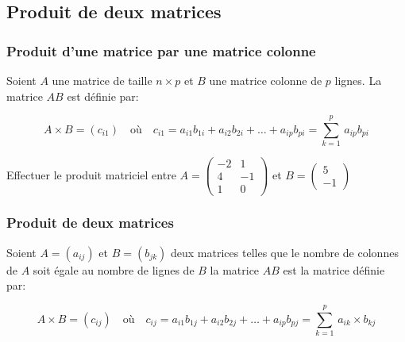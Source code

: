 \documentclass[a4paper]{article}
\begin{document}
\subsection{Produit de deux matrices}

\subsubsection{Produit d'une matrice par une matrice colonne}

\begin{definition}{}{}
	Soient $A$ une matrice de taille $n \times p$ et $B$ une matrice colonne de $p$ lignes. La matrice $AB$ est définie par:

$$A \times B = (c_{i1}) \quad \text{où} \quad  c_{i1}= a_{i1}b_{1i}+a_{i2}b_{2i}+\ldots + a_{ip}b_{pi}= \sum_{k=1}^{p}\,a_{ip}b_{pi}$$
\end{definition}

\begin{example}{}{}
	Effectuer le produit matriciel entre $A=\begin{pmatrix}
-2 & 1 \\
4 & -1 \\
1 & 0
\end{pmatrix}$ et $B=\begin{pmatrix}
5 \\
-1
\end{pmatrix}$
\end{example}
\subsubsection{Produit de deux matrices}

\begin{definition}{}{}
	Soient $A=(a_{ij})$ et $B=(b_{jk})$ deux matrices telles que le nombre de colonnes de $A$ soit égale au nombre de lignes de $B$ la matrice $AB$ est la matrice définie par:

$$A \times B=(c_{ij}) \quad \text{où} \quad  c_{ij}=a_{i1}b_{1j}+a_{i2}b_{2j}+\ldots + a_{ip}b_{pj}=\sum_{k=1}^{p} \, a_{ik} \times b_{kj}$$
\end{definition}

\bigskip
\end{document}
